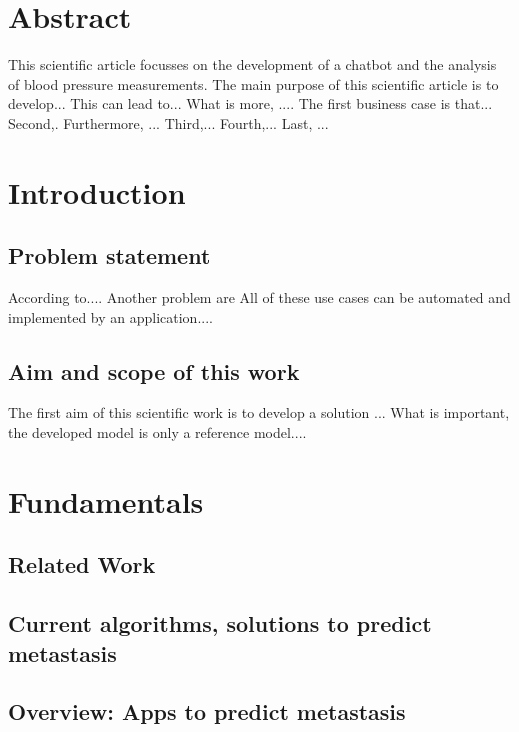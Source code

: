 



\chapter{Abstract}\label{abstract}

This scientific article focusses on the development of a chatbot and the analysis of blood pressure measurements.
The main purpose of this scientific article is to develop...
This can lead to...
What is more, .... 
The first business case is that...
Second,. 
Furthermore, ...
Third,...
Fourth,...
Last, ...

\chapter{Introduction}\label{introduction}

\section{Problem statement}
According to....
Another problem are 
All of these use cases can be automated and implemented by an application....

\section{Aim and scope of this work}
The first aim of this scientific work is to develop a solution ...
What is important, the developed model is only a reference model....

\chapter{Fundamentals}\label{fundamentals}

\section{Related Work}

\section{Current algorithms, solutions to predict metastasis}

\section{Overview: Apps to predict metastasis}

